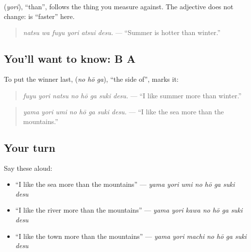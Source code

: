 \textbf{} (\emph{yori}), \textquotedblleft{}than\textquotedblright{}, follows the thing you measure against. The adjective does not change: \textbf{} is \textquotedblleft{}faster\textquotedblright{} here.

\begin{quote}
\textbf{  }
\end{quote}

\begin{quote}
\emph{natsu wa fuyu yori atsui desu.} — \textquotedblleft{}Summer is hotter than winter.\textquotedblright{}
\end{quote}

\subsection*{You'll want to know: B  A  }
To put the winner last, \textbf{ } (\emph{no hō ga}), \textquotedblleft{}the side of\textquotedblright{}, marks it:

\begin{quote}
\textbf{   }
\end{quote}

\begin{quote}
\emph{fuyu yori natsu no hō ga suki desu.} — \textquotedblleft{}I like summer more than winter.\textquotedblright{}
\end{quote}

\begin{quote}
\textbf{   }
\end{quote}

\begin{quote}
\emph{yama yori umi no hō ga suki desu.} — \textquotedblleft{}I like the sea more than the mountains.\textquotedblright{}
\end{quote}

\subsection*{Your turn}
Say these aloud:

\begin{itemize}
\raggedright
  \item \textquotedblleft{}I like the sea more than the mountains\textquotedblright{} — \emph{yama yori umi no hō ga suki desu}
  \item \textquotedblleft{}I like the river more than the mountains\textquotedblright{} — \emph{yama yori kawa no hō ga suki desu}
  \item \textquotedblleft{}I like the town more than the mountains\textquotedblright{} — \emph{yama yori machi no hō ga suki desu}
\end{itemize}

